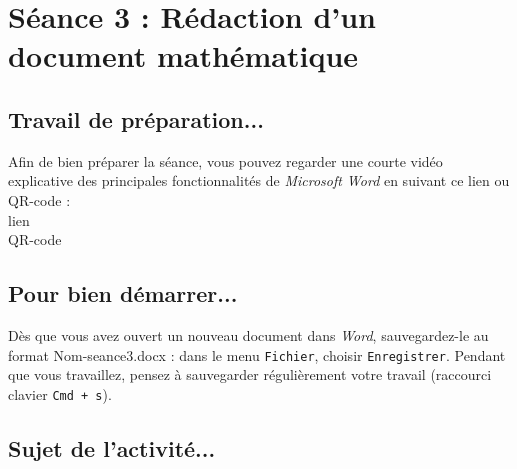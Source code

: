 


%
%
%
%




\pagebreak

\section{Séance 3 : Rédaction d'un document mathématique}\label{ficheTexte4e1}

\subsection{Travail de préparation...}

Afin de bien préparer la séance, vous pouvez regarder une courte vidéo explicative des principales fonctionnalités de \emph{Microsoft Word} en suivant ce lien ou QR-code :\\

lien\\
QR-code

\subsection{Pour bien démarrer...}

Dès que vous avez ouvert un nouveau document dans \emph{Word}, sauvegardez-le au format Nom-seance3.docx : dans le menu \texttt{Fichier}, choisir \texttt{Enregistrer}. Pendant que vous travaillez, pensez à sauvegarder régulièrement votre travail (raccourci clavier \texttt{Cmd + s}).   


\subsection{Sujet de l'activité...}

\vspace{10pt}


